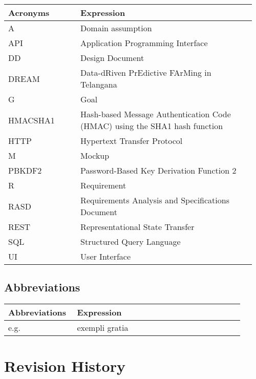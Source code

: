\begin{center}
	\begin{longtable}{@{}p{0.28\linewidth} p{0.68\linewidth}@{}}
		\toprule
		\textbf{Acronyms}   & \textbf{Expression}\\
		\endfirsthead
		\midrule
		A                   & Domain assumption\\
		API                 & Application Programming Interface\\
		DD                  & Design Document\\
		DREAM               & Data-dRiven PrEdictive FArMing in Telangana\\
		G					& Goal\\
		HMACSHA1            & Hash-based Message Authentication Code (HMAC) using the SHA1 hash function \\
		HTTP                & Hypertext Transfer Protocol\\
		M					& Mockup\\
		PBKDF2              & Password-Based Key Derivation Function 2 \\ 
		R                   & Requirement\\
		RASD                & Requirements Analysis and Specifications Document\\
		REST				& Representational State Transfer\\
		SQL                 & Structured Query Language\\
		UI				  	& User Interface\\
		\bottomrule
	\end{longtable}
\end{center}

\subsection{Abbreviations}

\begin{center}
	\begin{longtable}{@{}p{0.28\linewidth} p{0.68\linewidth}@{}}
		\toprule
		\textbf{Abbreviations}  & \textbf{Expression}\\
		\midrule
	    e.g. & exempli gratia\\
		\bottomrule
	\end{longtable}
\end{center}

\section{Revision History}

